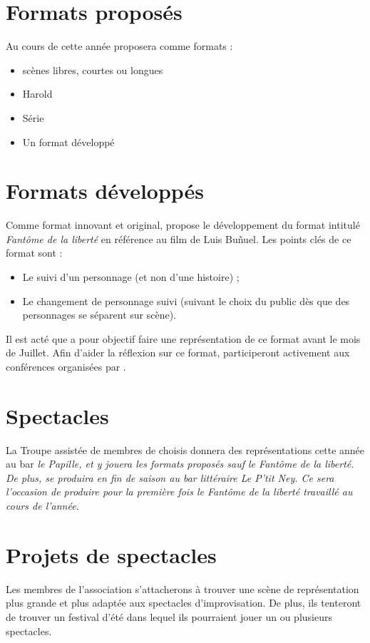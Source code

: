 
\section{Formats proposés}
Au cours de cette année \troupe{} proposera comme formats :
\begin{itemize}
\item scènes libres, courtes ou longues
\item Harold
\item Série
\item Un format développé
\end{itemize}

\section{Formats développés}
Comme format innovant et original, \troupe{} propose le développement du format intitulé \textit{Fantôme de la liberté} en référence au film de Luis Buñuel.
Les points clés de ce format sont :
\begin{itemize}
\item Le suivi d'un personnage (et non d'une histoire) ;
\item Le changement de personnage suivi (suivant le choix du public dès que des personnages se séparent sur scène).
\end{itemize}
Il est acté que \troupe{} a pour objectif faire une représentation de ce format avant le mois de Juillet.
Afin d'aider la réflexion sur ce format, \troupe{} participeront activement aux conférences organisées par \meta{}.

\section{Spectacles}
La Troupe assistée de membres de \meta{} choisis donnera des représentations cette année au bar \em{le Papille}, et y jouera les formats proposés sauf le \textit{Fantôme de la liberté}. De plus, \meta{} se produira en fin de saison au bar littéraire \em{Le P'tit Ney}. Ce sera l'occasion de produire pour la première fois le \textit{Fantôme de la liberté} travaillé au cours de l'année.

\section{Projets de spectacles}
Les membres de l'association s'attacherons à trouver une scène de représentation plus grande et plus adaptée aux spectacles d'improvisation. De plus, ils tenteront de trouver un festival d'été dans lequel ils pourraient jouer un ou plusieurs spectacles.

